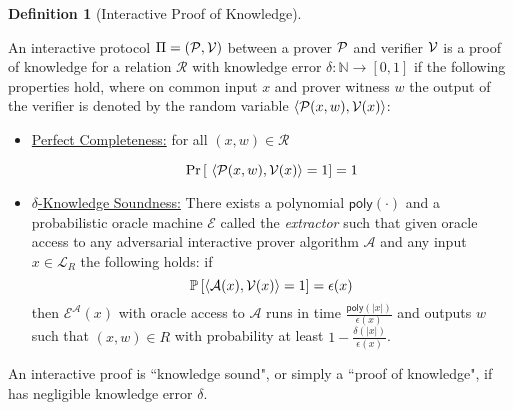 \documentclass{article}
\theoremstyle{definition}
\newtheorem{definition}{Definition}
\begin{document}
\begin{definition} [Interactive Proof of Knowledge]\label{def:proof}
  
An interactive protocol $\Pi = (\mathcal{P}, \mathcal{V})$ between a prover $\mathcal{P}$ and verifier $\mathcal{V}$ is a proof of knowledge for a relation $\mathcal{R}$ with knowledge error $\delta: \mathbb{N} \rightarrow [0,1]$ if the following properties hold, where on common input $x$ and prover witness $w$ the output of the verifier is denoted by the random variable $\langle \mathcal{P}(x,w), \mathcal{V}(x) \rangle$:

\begin{itemize}
\item \underline{Perfect Completeness:} for all $(x,w) \in \mathcal{R}$
\begin{small}
\[
\Pr \left[
         \ \langle \mathcal{P}(x,w), \mathcal{V}(x) \rangle = 1  
\right]  = 1 
 \]
 \end{small}
\item \underline{$\delta$-Knowledge Soundness:}
There exists a polynomial $\textsf{poly}(\cdot)$ and a probabilistic oracle machine $\mathcal{E}$ called the \emph{extractor} such that given oracle access to any adversarial interactive prover algorithm $\mathcal{A}$ and any input $x \in \mathcal{L}_R$ the following holds: if
$$\mathbb{P}\left[\langle \mathcal{A}(x), \mathcal{V}(x) \rangle = 1 \right] = \epsilon(x)$$
 then $\mathcal{E}^\mathcal{A}(x)$ with oracle access to $\mathcal{A}$ runs in time $\frac{\mathsf{poly}(|x|)}{\epsilon(x)}$ and outputs $w$ such that $(x, w) \in R$ with probability at least $1 - \frac{\delta(|x|)}{\epsilon(x)}$. 
\end{itemize} 
An interactive proof is ``knowledge sound", or simply a ``proof of knowledge", if has negligible knowledge error $\delta$. 
\end{definition} 
\end{document}
